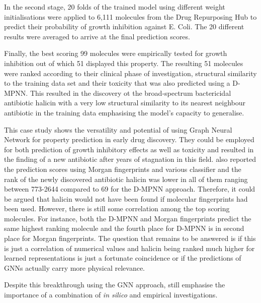 In the second stage, 20 folds of the trained model using different weight initialisations were applied to 6,111 molecules from the Drug Repurposing Hub \citep{corsello} to predict their probability of growth inhibition against E. Coli. The 20 different results were averaged to arrive at the final prediction scores. 

Finally, the best scoring 99 molecules were empirically tested for growth inhibition out of which 51 displayed this property. The resulting 51 molecules were ranked according to their clinical phase of investigation, structural similarity to the training data set and their toxicity that was also predicted using a D-MPNN. This resulted in the discovery ot the broad-spectrum bactericidal antibiotic halicin with a very low structural similarity to its nearest neighbour antibiotic in the training data emphasising the model's capacity to generalise. 

This case study shows the versatility and potential of using Graph Neural Network for property prediction in early drug discovery. They could be employed for both prediction of growth inhibitory effects as well as toxicity and resulted in the finding of a new antibiotic after years of stagnation in this field. \cite{STOKES2020688} also reported the prediction scores using Morgan fingerprints and various classifier and the rank of the newly discovered antibiotic halicin was lower in all of them ranging between 773-2644 compared to 69 for the D-MPNN approach. Therefore, it could be argued that halicin would not have been found if molecular fingerprints had been used. However, there is still some correlation among the top scoring molecules. For instance, both the D-MPNN and Morgan fingerprints predict the same highest ranking molecule and the fourth place for D-MPNN is in second place for Morgan fingerprints. The question that remains to be answered is if this is just a correlation of numerical values and halicin being ranked much higher for learned representations is just a fortunate coincidence or if the predictions of GNNs actually carry more physical relevance.

Despite this breakthrough using the GNN approach, \cite{STOKES2020688} still emphasise the importance of a combination of \emph{in silico} and empirical investigations. 

